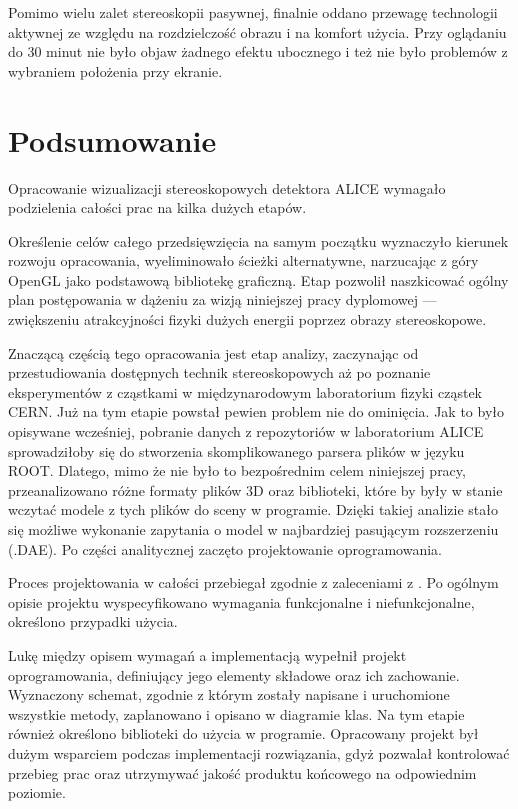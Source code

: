Pomimo wielu zalet stereoskopii pasywnej, finalnie oddano przewagę technologii aktywnej ze względu na rozdzielczość obrazu i na komfort użycia. Przy oglądaniu do 30 minut nie było objaw żadnego efektu ubocznego i też nie było problemów z wybraniem położenia przy ekranie.

\newpage
\section{Podsumowanie}
Opracowanie wizualizacji stereoskopowych detektora ALICE wymagało podzielenia całości prac na kilka dużych etapów.

Określenie celów całego przedsięwzięcia na samym początku wyznaczyło kierunek rozwoju opracowania, wyeliminowało ścieżki alternatywne, narzucając z góry OpenGL jako podstawową bibliotekę graficzną. Etap pozwolił naszkicować ogólny plan postępowania w dążeniu za wizją niniejszej pracy dyplomowej --- zwiększeniu atrakcyjności fizyki dużych energii poprzez obrazy stereoskopowe.

Znaczącą częścią tego opracowania jest etap analizy, zaczynając od przestudiowania dostępnych technik stereoskopowych aż po poznanie eksperymentów z cząstkami w międzynarodowym laboratorium fizyki cząstek CERN. Już na tym etapie powstał pewien problem nie do ominięcia. Jak to było opisywane wcześniej, pobranie danych z repozytoriów w laboratorium ALICE sprowadziłoby się do stworzenia skomplikowanego parsera plików w języku ROOT. Dlatego, mimo że nie było to bezpośrednim celem niniejszej pracy, przeanalizowano różne formaty plików 3D oraz biblioteki, które by były w stanie wczytać modele z tych plików do sceny w programie. Dzięki takiej analizie stało się możliwe wykonanie zapytania o model w najbardziej pasującym rozszerzeniu (.DAE). Po części analitycznej zaczęto projektowanie oprogramowania.

Proces projektowania w całości przebiegał zgodnie z zaleceniami z \cite{specyfikacja}. Po ogólnym opisie projektu wyspecyfikowano wymagania funkcjonalne i niefunkcjonalne, określono przypadki użycia.

Lukę między opisem wymagań a implementacją wypełnił projekt oprogramowania, definiujący jego elementy składowe oraz ich zachowanie. Wyznaczony schemat, zgodnie z którym zostały napisane i uruchomione wszystkie metody, zaplanowano i opisano w diagramie klas. Na tym etapie również określono biblioteki do użycia w programie. Opracowany projekt był dużym wsparciem podczas implementacji rozwiązania, gdyż pozwalał kontrolować przebieg prac oraz utrzymywać jakość produktu końcowego na odpowiednim poziomie.

